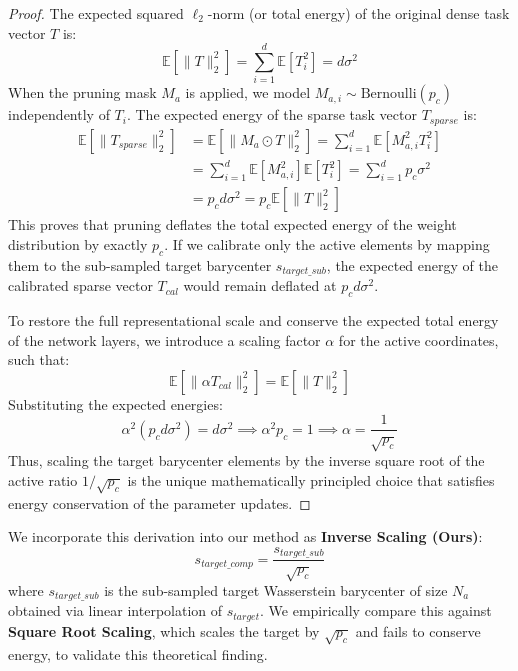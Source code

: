 \documentclass{article}
\theoremstyle{plain}
\theoremstyle{definition}
\theoremstyle{remark}
\begin{document}
\begin{proof}
The expected squared $\ell_2$-norm (or total energy) of the original dense task vector $T$ is:
\begin{equation}
    \mathbb{E}[\|T\|_2^2] = \sum_{i=1}^d \mathbb{E}[T_i^2] = d \sigma^2
\end{equation}
When the pruning mask $M_a$ is applied, we model $M_{a,i} \sim \text{Bernoulli}(p_c)$ independently of $T_i$. The expected energy of the sparse task vector $T_{sparse}$ is:
\begin{align}
    \mathbb{E}[\|T_{sparse}\|_2^2] &= \mathbb{E}[\|M_a \odot T\|_2^2] = \sum_{i=1}^d \mathbb{E}[M_{a,i}^2 T_i^2] \nonumber \\
    &= \sum_{i=1}^d \mathbb{E}[M_{a,i}^2] \mathbb{E}[T_i^2] = \sum_{i=1}^d p_c \sigma^2 \nonumber \\
    &= p_c d \sigma^2 = p_c \mathbb{E}[\|T\|_2^2]
\end{align}
This proves that pruning deflates the total expected energy of the weight distribution by exactly $p_c$. If we calibrate only the active elements by mapping them to the sub-sampled target barycenter $s_{target\_sub}$, the expected energy of the calibrated sparse vector $T_{cal}$ would remain deflated at $p_c d \sigma^2$.

To restore the full representational scale and conserve the expected total energy of the network layers, we introduce a scaling factor $\alpha$ for the active coordinates, such that:
\begin{equation}
    \mathbb{E}[\|\alpha T_{cal}\|_2^2] = \mathbb{E}[\|T\|_2^2]
\end{equation}
Substituting the expected energies:
\begin{equation}
    \alpha^2 (p_c d \sigma^2) = d \sigma^2 \implies \alpha^2 p_c = 1 \implies \alpha = \frac{1}{\sqrt{p_c}}
\end{equation}
Thus, scaling the target barycenter elements by the inverse square root of the active ratio $1/\sqrt{p_c}$ is the unique mathematically principled choice that satisfies energy conservation of the parameter updates.
\end{proof}

We incorporate this derivation into our method as \textbf{Inverse Scaling (Ours)}:
\begin{equation}
    s_{target\_comp} = \frac{s_{target\_sub}}{\sqrt{p_c}}
\end{equation}
where $s_{target\_sub}$ is the sub-sampled target Wasserstein barycenter of size $N_a$ obtained via linear interpolation of $s_{target}$. We empirically compare this against \textbf{Square Root Scaling}, which scales the target by $\sqrt{p_c}$ and fails to conserve energy, to validate this theoretical finding.
\end{document}
